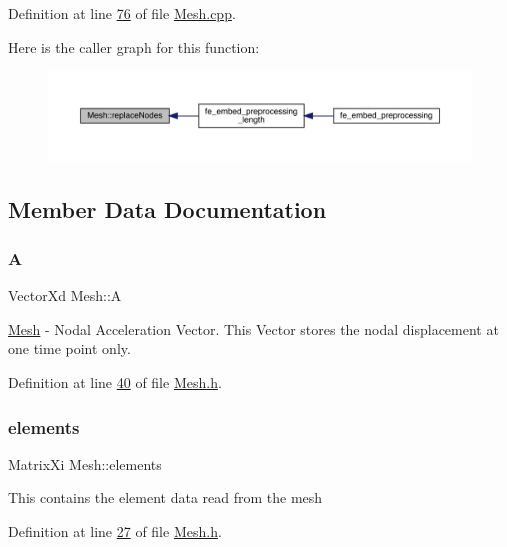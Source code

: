 Definition at line \hyperlink{_mesh_8cpp_source_l00076}{76} of file \hyperlink{_mesh_8cpp_source}{Mesh.\+cpp}.

Here is the caller graph for this function\+:\nopagebreak
\begin{figure}[H]
\begin{center}
\leavevmode
\includegraphics[width=350pt]{class_mesh_af03b49cbaf762652c9ff5ff7f4a6e668_icgraph}
\end{center}
\end{figure}


\subsection{Member Data Documentation}
\mbox{\label{class_mesh_ae7202a4f96820433c69bc2ea4cc1b31d}} 
\subsubsection{\texorpdfstring{A}{A}}
{\footnotesize\ttfamily Vector\+Xd Mesh\+::A\hspace{0.3cm}{\ttfamily [private]}}

\hyperlink{class_mesh}{Mesh} -\/ Nodal Acceleration Vector. This Vector stores the nodal displacement at one time point only. 

Definition at line \hyperlink{_mesh_8h_source_l00040}{40} of file \hyperlink{_mesh_8h_source}{Mesh.\+h}.

\mbox{\label{class_mesh_a32aed9620eeb7eaf93a3f8c8f6e79bde}} 
\subsubsection{\texorpdfstring{elements}{elements}}
{\footnotesize\ttfamily Matrix\+Xi Mesh\+::elements\hspace{0.3cm}{\ttfamily [private]}}

This contains the element data read from the mesh 

Definition at line \hyperlink{_mesh_8h_source_l00027}{27} of file \hyperlink{_mesh_8h_source}{Mesh.\+h}.

